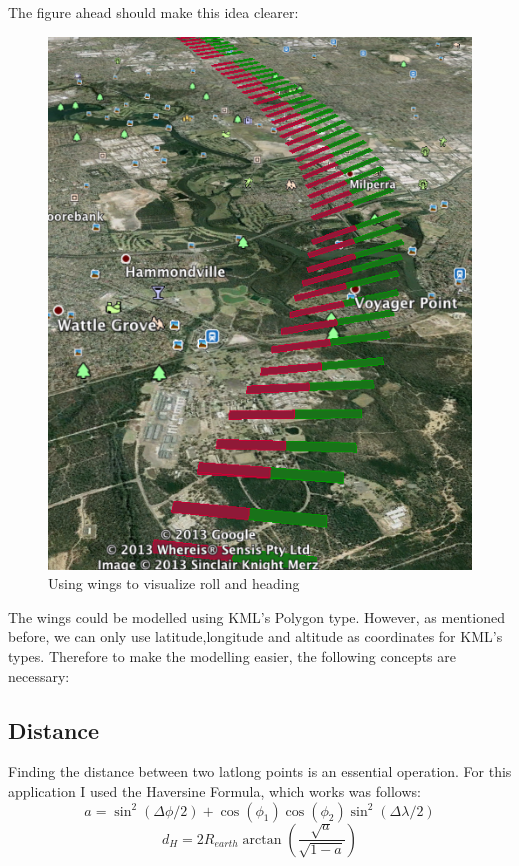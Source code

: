 The figure ahead should make this idea clearer:\\

\begin{figure}[h]
\caption{Using wings to visualize roll and heading}
\centering
\includegraphics[scale=0.5]{gfx/roll-sample.png}
\end{figure}

The wings could be modelled using KML's Polygon type. However, as mentioned before, we can only use latitude,longitude and altitude as coordinates for KML's types. Therefore to make the modelling easier, the following concepts are necessary:

\subsection{Distance}

Finding the distance between two latlong points is an essential operation. For this application I used the Haversine Formula, which works was follows\citep{latlong}:
\begin{equation}
  a = \sin^2(\Delta\phi/2) + \cos(\phi_{1}) \cos(\phi_{2})\sin^2(\Delta\lambda/2)
\end{equation}
\begin{equation}
  d_{H} = 2 R_{earth} \arctan(\frac{\sqrt{a}}{\sqrt{1 - a}})
\end{equation}

